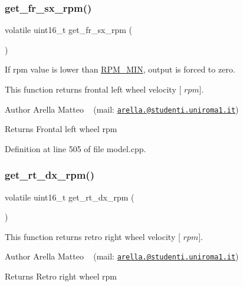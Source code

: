 \subsubsection{\texorpdfstring{get\+\_\+fr\+\_\+sx\+\_\+rpm()}{get\_fr\_sx\_rpm()}}
{\footnotesize\ttfamily volatile uint16\+\_\+t get\+\_\+fr\+\_\+sx\+\_\+rpm (\begin{DoxyParamCaption}{ }\end{DoxyParamCaption})}



If rpm value is lower than \mbox{\hyperlink{group___board__model__group_gafc05771487f188ffa40b6620afc1a9bc}{R\+P\+M\+\_\+\+M\+IN}}, output is forced to zero. 

This function returns frontal left wheel velocity \mbox{[} $rpm$\mbox{]}.

\begin{DoxyAuthor}{Author}
Arella Matteo ~\newline
 (mail\+: \href{mailto:arella.1646983@studenti.uniroma1.it}{\tt arella.@studenti.\+uniroma1.\+it})
\end{DoxyAuthor}
\begin{DoxyReturn}{Returns}
Frontal left wheel rpm 
\end{DoxyReturn}


Definition at line 505 of file model.\+cpp.

\mbox{\label{group___board__model__group_ga812f59d2bf258b811a7ff9184ba23e78}} 
\subsubsection{\texorpdfstring{get\+\_\+rt\+\_\+dx\+\_\+rpm()}{get\_rt\_dx\_rpm()}}
{\footnotesize\ttfamily volatile uint16\+\_\+t get\+\_\+rt\+\_\+dx\+\_\+rpm (\begin{DoxyParamCaption}{ }\end{DoxyParamCaption})}



This function returns retro right wheel velocity \mbox{[} $rpm$\mbox{]}. 

\begin{DoxyAuthor}{Author}
Arella Matteo ~\newline
 (mail\+: \href{mailto:arella.1646983@studenti.uniroma1.it}{\tt arella.@studenti.\+uniroma1.\+it})
\end{DoxyAuthor}
\begin{DoxyReturn}{Returns}
Retro right wheel rpm 
\end{DoxyReturn}
\mbox{\label{group___board__model__group_ga81c1dfd585ff1f0b26b38148909e064c}} 
